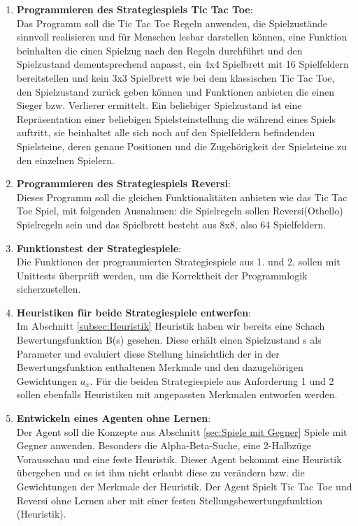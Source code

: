 \begin{enumerate}
\item \textbf{Programmieren des Strategiespiels Tic Tac Toe}: \\
Das Programm soll die Tic Tac Toe Regeln anwenden, die Spielzustände sinnvoll realisieren und für Menschen lesbar darstellen können, eine Funktion beinhalten die einen Spielzug nach den Regeln durchführt und den Spielzustand dementsprechend anpasst, ein 4x4 Spielbrett mit 16 Spielfeldern bereitstellen und kein 3x3 Spielbrett wie bei dem klassischen Tic Tac Toe, den Spielzustand zurück geben können und Funktionen anbieten die einen Sieger bzw. Verlierer ermittelt. Ein beliebiger Spielzustand ist eine Repräsentation einer beliebigen Spielsteinstellung die während eines Spiels auftritt, sie beinhaltet alle sich noch auf den Spielfeldern befindenden Spielsteine, deren genaue Positionen und die Zugehörigkeit der Spielsteine zu den einzelnen Spielern.

\item \textbf{Programmieren des Strategiespiels Reversi}: \\
Dieses Programm soll die gleichen Funktionalitäten anbieten wie das Tic Tac Toe Spiel, mit folgenden Ausnahmen: die Spielregeln sollen Reversi(Othello) Spielregeln sein und das Spielbrett besteht aus 8x8, also 64 Spielfeldern.
	
\item \textbf{Funktionstest der Strategiespiele}: \\
Die Funktionen der programmierten Strategiespiele aus 1. und 2. sollen mit Unittests überprüft werden, um die Korrektheit der Programmlogik sicherzustellen.
	
\item \textbf{Heuristiken für beide Strategiespiele entwerfen}: \\
Im Abschnitt \ref{subsec:Heuristik} Heuristik haben wir bereits eine Schach Bewertungsfunktion B(s) gesehen. Diese erhält einen Spielzustand s als Parameter und evaluiert diese Stellung hinsichtlich der in der Bewertungsfunktion enthaltenen Merkmale und den dazugehörigen Gewichtungen $a_x$. Für die beiden Strategiespiele aus Anforderung 1 und 2 sollen ebenfalls Heuristiken mit angepassten Merkmalen entworfen werden.
	
\item \textbf{Entwickeln eines Agenten ohne Lernen}: \\
Der Agent soll die Konzepte aus Abschnitt \ref{sec:Spiele mit Gegner} Spiele mit Gegner anwenden. Besonders die Alpha-Beta-Suche, eine 2-Halbzüge Vorausschau und eine feste Heuristik.  Dieser Agent bekommt eine Heuristik übergeben und es ist ihm nicht erlaubt diese zu verändern bzw. die Gewichtungen der Merkmale der Heuristik. Der Agent Spielt Tic Tac Toe und Reversi ohne Lernen aber mit einer festen Stellungsbewertungsfunktion (Heuristik).
	

\end{enumerate}
